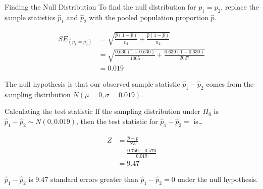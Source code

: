 \documentclass[
  ignorenonframetext,
]{beamer}
\begin{document}
\begin{frame}{Finding the Null Distribution}
\label{finding-the-null-distribution-1}
To find the null distribution for \(p_1=p_2\), replace the sample
statistics \(\hat{p}_1\) and \(\hat{p}_2\) with the pooled population
proportion \(\hat{p}\).

\[
\begin{aligned}
SE_{(p_1=p_2)}&=\sqrt{\frac{\hat{p}(1-\hat{p})}{n_1}+\frac{\hat{p}(1-\hat{p})}{n_2}} \\
&=\sqrt{\frac{0.630(1-0.630)}{1005}+\frac{0.630(1-0.630)}{2027}} \\
&=0.019
\end{aligned}
\]

\pause

The null hypothesis is that our observed sample statistic
\(\hat{p}_1-\hat{p}_2\) comes from the sampling distribution
\(N(\mu=0, \sigma=0.019)\).
\end{frame}

\begin{frame}{Calculating the test statistic}
\label{calculating-the-test-statistic-1}
If the sampling distribution under \(H_0\) is
\(\hat{p}_1-\hat{p}_2 \sim N(0, 0.019)\), then the test statistic for
\(\hat{p}_1-\hat{p}_2=\) is\ldots{}

\[
\begin{aligned}
Z &= \frac{\hat{p} - p}{SE} \\
&= \frac{0.750-0.570}{0.019} \\
&=9.47
\end{aligned}
\]

\pause

\(\hat{p}_1-\hat{p}_2\) is 9.47 standard errors greater than
\(\hat{p}_1-\hat{p}_2=0\) under the null hypothesis.
\end{frame}
\end{document}
